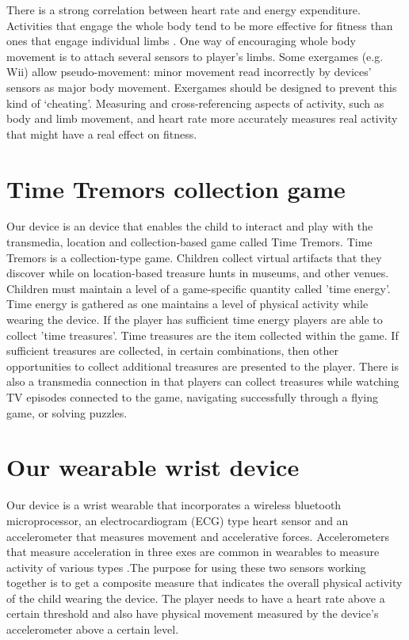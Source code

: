 \documentclass{SIGCHI2015LaTex/sigchi}
\begin{document}
There is a strong correlation between heart rate and energy expenditure\cite{whitehead2010exergame}. Activities that engage the whole body tend to be more effective for fitness than ones that engage individual limbs \cite{mortazavi2014near}. One way of encouraging whole body movement is to attach several sensors to player's limbs. Some exergames (e.g. Wii) allow pseudo-movement: minor movement read incorrectly by devices' sensors as major body movement. Exergames should be designed to prevent this kind of `cheating'. Measuring and cross-referencing aspects of activity, such as body and limb movement, and heart rate more accurately measures real activity that might have a real effect on fitness.  

\section{Time Tremors collection game}
Our device is an device that enables the child to interact and play with the transmedia, location and collection-based game called Time Tremors. Time Tremors is a collection-type game. Children collect virtual artifacts that they discover while on location-based treasure hunts in museums, and other venues. Children must maintain a level of a game-specific quantity called 'time energy'. Time energy is gathered as one maintains a level of physical activity while wearing the device. If the player has sufficient time energy players are able to collect 'time treasures'. Time treasures are the item collected within the game. If sufficient treasures are collected, in certain combinations, then other opportunities to collect additional treasures are presented to the player. There is also a transmedia connection in that players can collect treasures while watching TV episodes connected to the game, navigating successfully through a flying game, or solving puzzles.

\section{Our wearable wrist device}
Our device is a wrist wearable that incorporates a wireless bluetooth microprocessor, an electrocardiogram (ECG) type heart sensor and an accelerometer that measures movement and accelerative forces. Accelerometers that measure acceleration in three exes are common in wearables to measure activity of various types \cite{alshurafa2014designing}.The purpose for using these two sensors working together is to get a composite measure that indicates the overall physical activity of the child wearing the device. The player needs to have a heart rate above a certain threshold and also have physical movement measured by the device's accelerometer above a certain level. 
\end{document}
